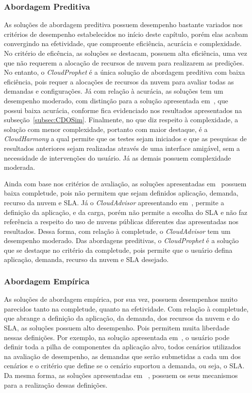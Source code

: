 \subsubsection{Abordagem Preditiva}
As soluções de abordagem preditiva possuem desempenho bastante variados nos
critérios de desempenho estabelecidos no início deste capítulo, porém elas
acabam convergindo na efetividade, que comproente eficiência, acurácia e
complexidade. No critério de eficência, as soluções se destacam, possuem
alta eficiência, uma vez que não requerem a alocação de recursos de nuvem para
realizarem as predições. No entanto, o \textit{CloudProphet} é a única solução
de abordagem preditiva com baixa eficiência, pois requer a alocações de recursos da nuvem para
avaliar todas as demandas e configurações. Já com relação à acurácia, as
soluções tem um desempenho moderado, com distinção para a solução apresentada
em~\cite{fittkau2012cdosim}, que possui baixa acurácia, conforme fica
evidenciado nos resultados apresentados na subseção~\ref{subsec:CDOSim}.
Finalmente, no que diz respeito à complexidade, a solução com menor
complexidade, portanto com maior destaque, é a \textit{CloudHarmony} a qual
permite que os testes sejam iniciados e que as pesquisas de resultados
anteriores sejam realizadas através de uma interface amigável, sem a necessidade de intervenções do usuário.
Já as demais possuem complexidade moderada.
 
Ainda com base nos critérios de avaliação, as soluções apresentadas
em~\cite{malkowski2010cloudxplor,cloudharmony} possuem baixa completude, pois
não permitem que sejam definidos aplicação, demanda, recurso da nuvem e SLA. Já
o \textit{CloudAdvisor} apresentando em~\cite{jung2013cloudadvisor}, permite a
definição da aplicação, e da carga, porém não permite a escolha do SLA e não
faz referência a respeito do uso de nuvens públicas diferentes das apresentadas
nos resultados. Dessa forma, com relação à completude, o \textit{CloudAdvisor}
tem um desempenho moderado. Das abordagens preditivas, o \textit{CloudProphet}
é a solução que se destaque no critério da completude, pois permite que o
usuário defina aplicação, demanda, recurso da nuvem e SLA desejado.

\subsubsection{Abordagem Empírica}
As soluções de abordagem empírica, por sua vez, possuem desempenhos muito
parecidos tanto na completude, quanto na efetividade. Com relação à
completude, que abrange a definição da aplicação, da demanda, dos recursos da
nuvem e do SLA, as soluções possuem alto desempenho. Pois permitem muita
liberdade nessas definições. Por exemplo, na solução apresentada
em~\cite{cunhacloud}, o usuário pode definir toda a pilha de componentes
da aplicação alvo, todos cenários utilizados na avaliação de desempenho, as
demandas que serão submetidas a cada um dos cenários e o critério que define se
o cenário suportou a demanda, ou seja, o SLA. Da mesma forma, as soluções
apresentadas em ~\cite{jayasinghe2012,silva2013cloudbench,scheuner2014cloud},
possuem os seus mecanismos para a realização dessas definições.

